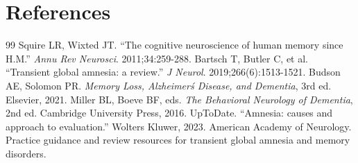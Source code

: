 \section*{References}
\begin{thebibliography}{99}
 Squire LR, Wixted JT. ``The cognitive neuroscience of human memory since H.M.'' \textit{Annu Rev Neurosci}. 2011;34:259-288.
 Bartsch T, Butler C, et al. ``Transient global amnesia: a review.'' \textit{J Neurol}. 2019;266(6):1513-1521.
 Budson AE, Solomon PR. \textit{Memory Loss, Alzheimer\'s Disease, and Dementia}, 3rd ed. Elsevier, 2021.
 Miller BL, Boeve BF, eds. \textit{The Behavioral Neurology of Dementia}, 2nd ed. Cambridge University Press, 2016.
 UpToDate. ``Amnesia: causes and approach to evaluation.'' Wolters Kluwer, 2023.
 American Academy of Neurology. Practice guidance and review resources for transient global amnesia and memory disorders.
\end{thebibliography}
